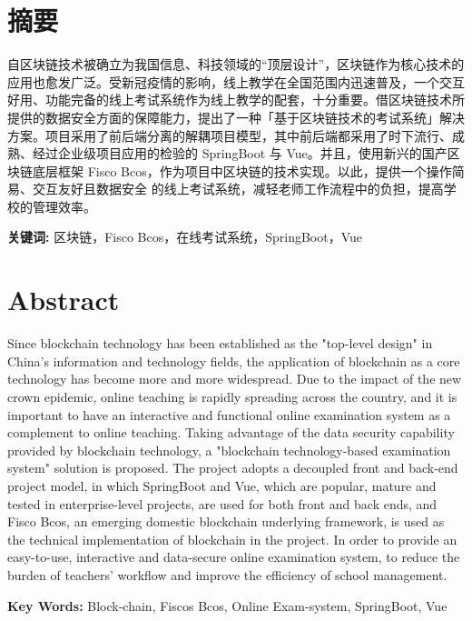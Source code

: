 \section*{ \centering 摘要}
\vskip0.5cm
自区块链技术被确立为我国信息、科技领域的“顶层设计”，区块链作为核心技术的应用也愈发广泛。受新冠疫情的影响，线上教学在全国范围内迅速普及，一个交互好用、功能完备的线上考试系统作为线上教学的配套，十分重要。借区块链技术所提供的数据安全方面的保障能力，提出了一种「基于区块链技术的考试系统」解决方案。项目采用了前后端分离的解耦项目模型，其中前后端都采用了时下流行、成熟、经过企业级项目应用的检验的 SpringBoot 与 Vue。并且，使用新兴的国产区块链底层框架 Fisco Bcos，作为项目中区块链的技术实现。以此，提供一个操作简易、交互友好且数据安全  的线上考试系统，减轻老师工作流程中的负担，提高学校的管理效率。

\textbf{关键词:} 区块链，Fisco Bcos，在线考试系统，SpringBoot，Vue

\clearpage  %

\section*{ \centering \textbf{Abstract}}
\vskip0.5cm
Since blockchain technology has been established as the "top-level design" in China's information and technology fields, the application of blockchain as a core technology has become more and more widespread. Due to the impact of the new crown epidemic, online teaching is rapidly spreading across the country, and it is important to have an interactive and functional online examination system as a complement to online teaching. Taking advantage of the data security capability provided by blockchain technology, a "blockchain technology-based examination system" solution is proposed. The project adopts a decoupled front and back-end project model, in which SpringBoot and Vue, which are popular, mature and tested in enterprise-level projects, are used for both front and back ends, and Fisco Bcos, an emerging domestic blockchain underlying framework, is used as the technical implementation of blockchain in the project. In order to provide an easy-to-use, interactive and data-secure online examination system, to reduce the burden of teachers' workflow and improve the efficiency of school management.

\textbf{Key Words:} Block-chain, Fiscos Bcos, Online Exam-system, SpringBoot, Vue
